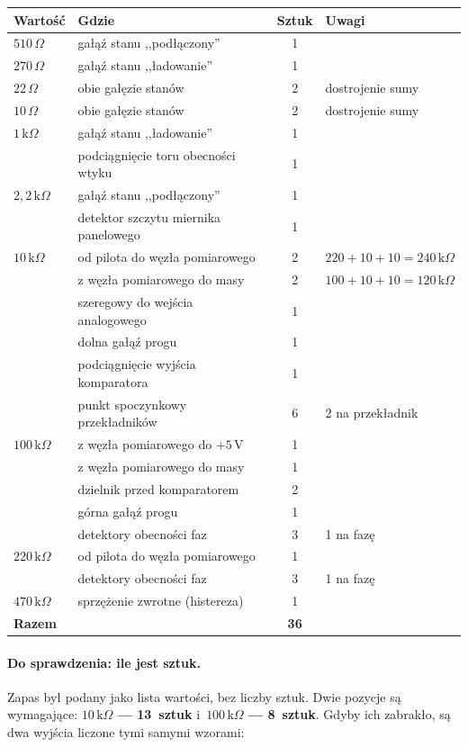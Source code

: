 \documentclass[a4paper,11pt]{article}
\newcommand{\ohm}{\,\Omega}
\newcommand{\kohm}{\,\mathrm{k}\Omega}
\newcommand{\volt}{\,\mathrm{V}}
\begin{document}
\begin{center}
\begin{tabular}{llcl}
\toprule
Wartość & Gdzie & Sztuk & Uwagi \\
\midrule
$510\ohm$  & gałąź stanu ,,podłączony'' & 1 & \\
$270\ohm$  & gałąź stanu ,,ładowanie''  & 1 & \\
$22\ohm$   & obie gałęzie stanów        & 2 & dostrojenie sumy \\
$10\ohm$   & obie gałęzie stanów        & 2 & dostrojenie sumy \\
\midrule
$1\kohm$   & gałąź stanu ,,ładowanie''  & 1 & \\
           & podciągnięcie toru obecności wtyku & 1 & \\
$2{,}2\kohm$ & gałąź stanu ,,podłączony'' & 1 & \\
           & detektor szczytu miernika panelowego & 1 & \\
$10\kohm$  & od pilota do węzła pomiarowego & 2 & $220+10+10=240\kohm$ \\
           & z węzła pomiarowego do masy & 2 & $100+10+10=120\kohm$ \\
           & szeregowy do wejścia analogowego & 1 & \\
           & dolna gałąź progu & 1 & \\
           & podciągnięcie wyjścia komparatora & 1 & \\
           & punkt spoczynkowy przekładników & 6 & 2 na przekładnik \\
$100\kohm$ & z węzła pomiarowego do $+5\volt$ & 1 & \\
           & z węzła pomiarowego do masy & 1 & \\
           & dzielnik przed komparatorem & 2 & \\
           & górna gałąź progu & 1 & \\
           & detektory obecności faz & 3 & 1 na fazę \\
$220\kohm$ & od pilota do węzła pomiarowego & 1 & \\
           & detektory obecności faz & 3 & 1 na fazę \\
$470\kohm$ & sprzężenie zwrotne (histereza) & 1 & \\
\midrule
\multicolumn{2}{l}{\textbf{Razem}} & \textbf{36} & \\
\bottomrule
\end{tabular}
\end{center}

\paragraph{Do sprawdzenia: ile jest sztuk.} Zapas był podany jako lista wartości,
bez liczby sztuk. Dwie pozycje są wymagające: \textbf{$10\kohm$ --- 13~sztuk}
i~\textbf{$100\kohm$ --- 8~sztuk}. Gdyby ich zabrakło, są dwa wyjścia liczone tymi
samymi wzorami:
\end{document}
